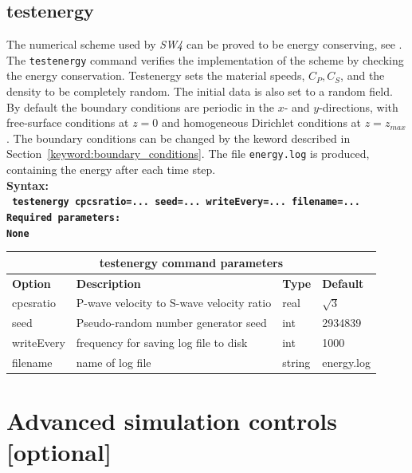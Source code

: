 \documentclass[11pt]{report}
\begin{document}
\subsection{testenergy}
\begin{flushleft}
The numerical scheme used by \emph{SW4} can be proved to be energy conserving, see \cite{SjoPet-12}. 
The {\tt testenergy} command verifies the implementation of the scheme by checking the energy conservation.
Testenergy sets the material speeds, $C_P,C_S$, and the density to be completely random. The initial data
is also set to a random field.
By default the boundary conditions are periodic in the $x$- and $y$-directions, with free-surface conditions
at $z=0$ and homogeneous Dirichlet conditions at $z=z_{max}$. The boundary conditions can be changed by
the keword described in Section~\ref{keyword:boundary_conditions}.
The file \verb+energy.log+ is produced, containing the energy after each time step. 
\\
\bf
Syntax:\\
\tt
testenergy cpcsratio=... seed=... writeEvery=... filename=...
\\
\bf 
Required parameters:\\
\rm
None
\end{flushleft}
\begin{center}
\begin{tabular}{|l|p{8cm}|l|l|} \hline
\multicolumn{4}{|c|}{\bf testenergy command parameters}\\ \hline
\bf{Option} & \bf{Description} & \bf{Type} & \bf{Default} \\ \hline \hline
cpcsratio   & P-wave velocity to S-wave velocity ratio & real & $\sqrt{3}$ \\ \hline
seed   & Pseudo-random number generator seed & int & 2934839 \\ \hline
writeEvery  & frequency for saving log file to disk & int & 1000 \\ \hline
filename  & name of log file & string & energy.log \\ \hline
\end{tabular}
\end{center}


\section{Advanced simulation controls [optional]}
\end{document}
